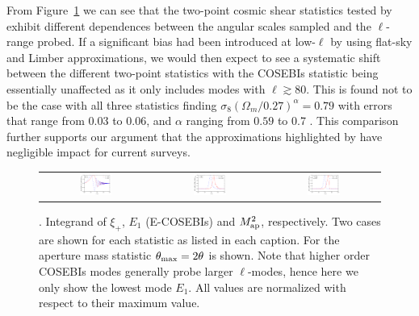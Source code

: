 From Figure~\ref{fig:filters} we can see that the two-point cosmic shear statistics tested by \citet{kilbinger/etal:2013} exhibit different dependences between the angular scales sampled and the $\ell$-range probed.   
If a significant bias had been introduced at low-$\ell$ by using flat-sky and Limber approximations, we would then expect to see a systematic shift between the different two-point statistics with the COSEBIs statistic being essentially unaffected as it only includes modes with $\ell \gtrsim 80$.  This is found not to be the case with all three statistics finding $\sigma_8 (\Omega_m/0.27)^\alpha = 0.79$ with errors that range from $0.03$ to $0.06$, and $\alpha$ ranging from $0.59$ to 0.7 \citep[see Table 5 of][]{kilbinger/etal:2013}.  This comparison further supports our argument that the approximations highlighted by \citet{kitching/etal:2016} have negligible impact for current surveys.

\begin{figure}[htb]
\begin{center}
\begin{tabular}{ccc}
\includegraphics[width=0.31\textwidth]{figures/IntegKsip.pdf} &
\includegraphics[width=0.31\textwidth]{figures/IntegCOSEBIs.pdf} &
\includegraphics[width=0.31\textwidth]{figures/IntegMap.pdf}
\end{tabular}
\caption{ \label{fig:filters}. Integrand of $\xi_+$, $E_1$ (E-COSEBIs) and $M^2_{\rm ap}$, respectively.
Two cases are shown for each statistic as listed in each caption.
For the aperture mass statistic $\theta_{\rm max}=2\theta$ is shown. 
Note that higher order COSEBIs modes generally probe larger $\ell$-modes, hence here we only show the lowest mode $E_1$. All values are normalized with respect to their maximum value. 
}
\end{center}
\end{figure}


